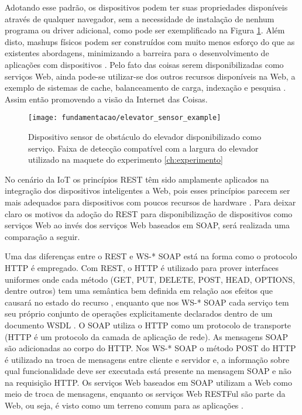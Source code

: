Adotando esse padrão, os dispositivos podem ter suas propriedades disponíveis através de qualquer navegador, sem a necessidade de instalação de nenhum programa ou driver adicional, como pode ser exemplificado na Figura \ref{fig:dispnavegador}. Além disto, mashups físicos\footnotemark {} podem ser construídos com muito menos esforço do que as existentes abordagens, minimizando a barreira para o desenvolvimento de aplicações com dispositivos \cite{Guinard:2009}. Pelo fato das coisas serem disponibilizadas como serviços Web, ainda pode-se utilizar-se dos outros recursos disponíveis na Web, a exemplo de sistemas de cache, balanceamento de carga, indexação e pesquisa \cite{Franca:2011}. Assim então promovendo a visão da Internet das Coisas.

\begin{figure}[!htb] \centering 
  \centering
  \texttt{[image: fundamentacao/elevator\_sensor\_example]} 
  \caption{Dispositivo sensor de obstáculo do elevador disponibilizado como serviço. Faixa de detecção compatível com a largura do elevador utilizado na maquete do experimento    \ref{ch:experimento}} 
  \label{fig:dispnavegador}
\end{figure}

No cenário da IoT os princípios REST têm sido amplamente aplicados na integração dos dispositivos inteligentes a Web, pois esses princípios parecem ser mais adequados para dispositivos com poucos recursos de hardware \cite{Franca:2011}. Para deixar claro os motivos da adoção do REST para disponibilização de dispositivos como serviços Web ao invés dos serviços Web baseados em SOAP, será realizada uma comparação a seguir.

Uma das diferenças entre o REST e WS-* SOAP está na forma como o protocolo HTTP é empregado. Com REST, o HTTP é utilizado para prover interfaces uniformes onde cada método (GET, PUT, DELETE, POST, HEAD, OPTIONS, dentre outros) tem uma semântica bem definida em relação aos efeitos que causará no estado do recurso \cite{Franca:2011}, enquanto que nos WS-* SOAP cada serviço tem seu próprio conjunto de operações explicitamente declarados dentro de um documento WSDL \cite{Pautasso:2014}. O SOAP utiliza o HTTP como um protocolo de transporte (HTTP é um protocolo da camada de aplicação de rede). As mensagens SOAP são adicionadas ao corpo do HTTP. Nos WS-* SOAP o método POST do HTTP é utilizado na troca de mensagens entre cliente e servidor e, a informação sobre qual funcionalidade deve ser executada está presente na mensagem SOAP e não na requisição HTTP. Os serviços Web baseados em SOAP utilizam a Web como meio de troca de mensagens, enquanto os serviços Web RESTFul são parte da Web, ou seja, é visto como um terreno comum para as aplicações \cite{Franca:2011}.

